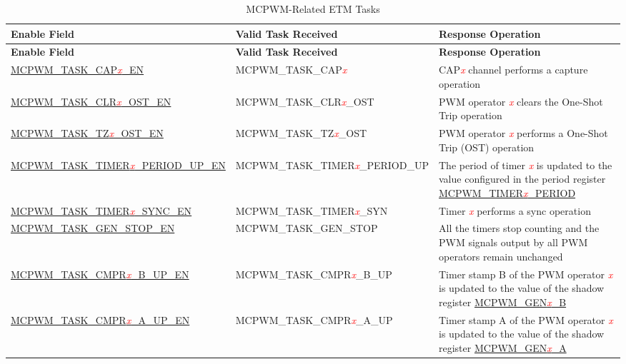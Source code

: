\begin{longtable}{ | l | l | p{4.4cm} |}
    \caption{MCPWM-Related ETM Tasks}
    \label{tab:mcpwm-etm-task}
    \\\hline
    \rowcolor{lightgray}
   \textbf{Enable Field} & \textbf{Valid Task Received} & \textbf{Response Operation} \\\hline
    \endfirsthead
    \hline
    \rowcolor{lightgray}   
    \textbf{Enable Field} & \textbf{Valid Task Received} & \textbf{Response Operation} \\\hline
    \endhead
    \hline
    \endfoot
    
    \hyperref[fielddesc:MCPWMTASKCAP0EN]{MCPWM\_TASK\_CAP\textcolor{red}{\it{x}}\_EN}
    &  MCPWM\_TASK\_CAP\textcolor{red}{\it{x}}
    &  CAP\textcolor{red}{\it{x}} channel performs a capture operation \\\hline
    \hyperref[fielddesc:MCPWMTASKCLR0OSTEN]{MCPWM\_TASK\_CLR\textcolor{red}{\it{x}}\_OST\_EN}
    &  MCPWM\_TASK\_CLR\textcolor{red}{\it{x}}\_OST
    &  PWM operator \textcolor{red}{\it{x}} clears the One-Shot Trip operation \\\hline
    \hyperref[fielddesc:MCPWMTASKTZ0OSTEN]{MCPWM\_TASK\_TZ\textcolor{red}{\it{x}}\_OST\_EN}
    &  MCPWM\_TASK\_TZ\textcolor{red}{\it{x}}\_OST
    &  PWM operator \textcolor{red}{\it{x}} performs a One-Shot Trip (OST) operation \\\hline
    \hyperref[fielddesc:MCPWMTASKTIMER0PERIODUPEN]{MCPWM\_TASK\_TIMER\textcolor{red}{\it{x}}\_PERIOD\_UP\_EN}
    &  MCPWM\_TASK\_TIMER\textcolor{red}{\it{x}}\_PERIOD\_UP
    &  The period of timer \textcolor{red}{\it{x}} is updated to the value configured in the period register \hyperref[fielddesc:MCPWMTIMER0PERIOD]{MCPWM\_TIMER\textcolor{red}{\it{x}}\_PERIOD} \\\hline
    \hyperref[fielddesc:MCPWMTASKTIMER0SYNCEN]{MCPWM\_TASK\_TIMER\textcolor{red}{\it{x}}\_SYNC\_EN}
    &  MCPWM\_TASK\_TIMER\textcolor{red}{\it{x}}\_SYN
    &  Timer \textcolor{red}{\it{x}} performs a sync operation \\\hline
    \hyperref[fielddesc:MCPWMTASKGENSTOPEN]{MCPWM\_TASK\_GEN\_STOP\_EN}
    &  MCPWM\_TASK\_GEN\_STOP
    &  All the timers stop counting and the PWM signals output by all PWM operators remain unchanged \\\hline
    \hyperref[fielddesc:MCPWMTASKCMPR0BUPEN]{MCPWM\_TASK\_CMPR\textcolor{red}{\it{x}}\_B\_UP\_EN}
    &  MCPWM\_TASK\_CMPR\textcolor{red}{\it{x}}\_B\_UP
    &  Timer stamp B of the PWM operator \textcolor{red}{\it{x}} is updated to the value of the shadow register \hyperref[regdesc:MCPWMGEN0BREG]{MCPWM\_GEN\textcolor{red}{\it{x}}\_B} \\\hline
    \hyperref[fielddesc:MCPWMTASKCMPR0AUPEN]{MCPWM\_TASK\_CMPR\textcolor{red}{\it{x}}\_A\_UP\_EN}
    &  MCPWM\_TASK\_CMPR\textcolor{red}{\it{x}}\_A\_UP
    &  Timer stamp A of the PWM operator \textcolor{red}{\it{x}} is updated to the value of the shadow register \hyperref[regdesc:MCPWMGEN0AREG]{MCPWM\_GEN\textcolor{red}{\it{x}}\_A} \\\hline
\end{longtable}